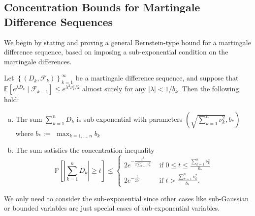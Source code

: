 \documentclass{article}
\newcommand{\bfs}[1]{\textbf{({#1})}}
\begin{document}
\subsection{Concentration Bounds for Martingale Difference Sequences}
We begin by stating and proving a general Bernstein-type bound for a martingale difference sequence, based on imposing a sub-exponential condition on the martingale differences.
\begin{thma}\label{thmamfs}%
Let $\left\{\left(D_{k}, \mathcal{F}_{k}\right)\right\}_{k=1}^{\infty}$ be a martingale difference sequence, and suppose that $\mathbb{E}\left[e^{\lambda D_{k}} \mid \mathcal{F}_{k-1}\right] \leq e^{\lambda^{2} \nu_{k}^{2} / 2}$ almost surely for any $|\lambda|<1 / b_{k} .$ Then the following hold:
\begin{enumerate}[(a)]
    \item The sum $\sum_{k=1}^{n} D_{k}$ is sub-exponential with parameters $\left(\sqrt{\sum_{k=1}^{n} \nu_{k}^{2}}, b_{*}\right)$ where $b_{*}:=$ $\max _{k=1, \ldots, n} b_{k}$
    \item The sum satisfies the concentration inequality
$$
\mathbb{P}\left[\left|\sum_{k=1}^{n} D_{k}\right| \geq t\right] \leq\left\{\begin{array}{ll}
2 e^{-\frac{t^{2}}{2 \sum_{k=1}^{n} \nu_{k}^{2}}} & \text { if } 0 \leq t \leq \frac{\sum_{k=1}^{n} \nu_{k}^{2}}{b_{*}} \\
2 e^{-\frac{t}{2 b_{*}}} & \text { if } t>\frac{\sum_{k=1}^{n} \nu_{k}^{2}}{b_{*}} .
\end{array}\right.
$$
\end{enumerate}
\end{thma}
\begin{rema}
We only need to consider the sub-exponential since other cases like sub-Gaussian or bounded variables are just special cases of sub-exponential variables.
\end{rema}
\end{document}
